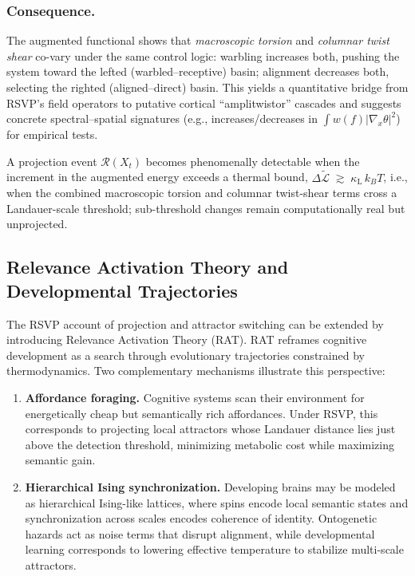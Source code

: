 \documentclass[a4paper,11pt]{article}
\begin{document}
\subsubsection{Consequence.}
The augmented functional shows that \emph{macroscopic torsion} and \emph{columnar
twist shear} co-vary under the same control logic: warbling increases both,
pushing the system toward the lefted (warbled–receptive) basin; alignment
decreases both, selecting the righted (aligned–direct) basin. This yields a
quantitative bridge from RSVP’s field operators to putative cortical
``amplitwistor'' cascades and suggests concrete spectral–spatial signatures
(e.g., increases/decreases in $\int w(f)|\nabla_x\theta|^2$) for empirical tests.

\begin{remark}
A projection event $\mathcal{R}(X_t)$ becomes phenomenally detectable when the
increment in the augmented energy exceeds a thermal bound,
$\Delta \widetilde{\mathcal{L}} \;\gtrsim\; \kappa_{\mathrm{L}}\,k_B T$,
i.e., when the combined macroscopic torsion and columnar twist-shear terms
cross a Landauer-scale threshold; sub-threshold changes remain computationally
real but unprojected.
\end{remark}

\subsection{Relevance Activation Theory and Developmental Trajectories}

The RSVP account of projection and attractor switching can be extended by
introducing Relevance Activation Theory (RAT). RAT reframes cognitive
development as a search through evolutionary trajectories constrained by
thermodynamics. Two complementary mechanisms illustrate this perspective:

\begin{enumerate}
    \item \textbf{Affordance foraging.} Cognitive systems scan their
    environment for energetically cheap but semantically rich affordances.
    Under RSVP, this corresponds to projecting local attractors whose Landauer
    distance lies just above the detection threshold, minimizing metabolic cost
    while maximizing semantic gain.

    \item \textbf{Hierarchical Ising synchronization.} Developing brains may be
    modeled as hierarchical Ising-like lattices, where spins encode local
    semantic states and synchronization across scales encodes coherence of
    identity. Ontogenetic hazards act as noise terms that disrupt alignment,
    while developmental learning corresponds to lowering effective temperature
    to stabilize multi-scale attractors.
\end{enumerate}
\end{document}
